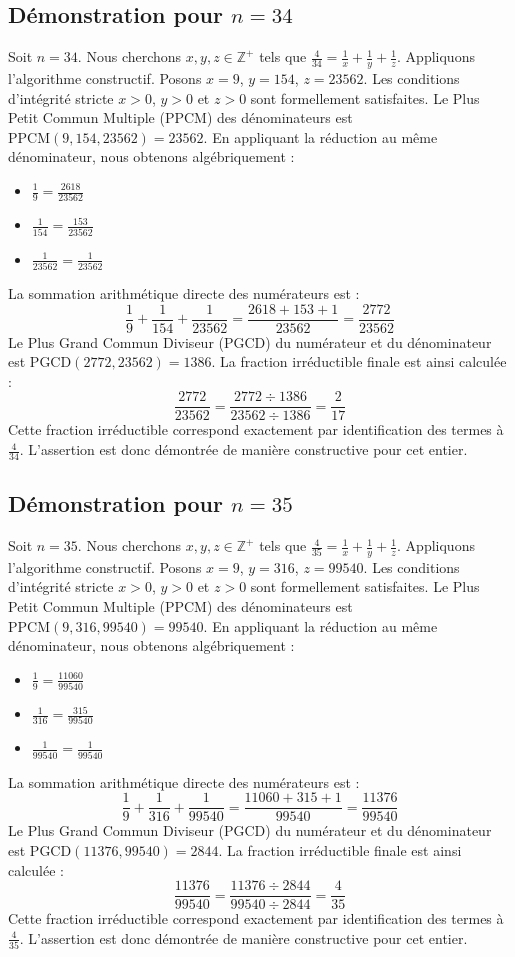 \documentclass[11pt,a4paper]{article}
\begin{document}
\subsection{Démonstration pour $n = 34$}
Soit $n = 34$. Nous cherchons $x, y, z \in \mathbb{Z}^{+}$ tels que $\frac{4}{34} = \frac{1}{x} + \frac{1}{y} + \frac{1}{z}$.
Appliquons l'algorithme constructif. Posons $x = 9$, $y = 154$, $z = 23562$.
Les conditions d'intégrité stricte $x > 0$, $y > 0$ et $z > 0$ sont formellement satisfaites.
Le Plus Petit Commun Multiple (PPCM) des dénominateurs est $\text{PPCM}(9, 154, 23562) = 23562$.
En appliquant la réduction au même dénominateur, nous obtenons algébriquement :
\begin{itemize}
    \item $\frac{1}{9} = \frac{2618}{23562}$
    \item $\frac{1}{154} = \frac{153}{23562}$
    \item $\frac{1}{23562} = \frac{1}{23562}$
\end{itemize}
La sommation arithmétique directe des numérateurs est :
$$ \frac{1}{9} + \frac{1}{154} + \frac{1}{23562} = \frac{2618 + 153 + 1}{23562} = \frac{2772}{23562} $$
Le Plus Grand Commun Diviseur (PGCD) du numérateur et du dénominateur est $\text{PGCD}(2772, 23562) = 1386$.
La fraction irréductible finale est ainsi calculée :
$$ \frac{2772}{23562} = \frac{2772 \div 1386}{23562 \div 1386} = \frac{2}{17} $$
Cette fraction irréductible correspond exactement par identification des termes à $\frac{4}{34}$. L'assertion est donc démontrée de manière constructive pour cet entier.

\subsection{Démonstration pour $n = 35$}
Soit $n = 35$. Nous cherchons $x, y, z \in \mathbb{Z}^{+}$ tels que $\frac{4}{35} = \frac{1}{x} + \frac{1}{y} + \frac{1}{z}$.
Appliquons l'algorithme constructif. Posons $x = 9$, $y = 316$, $z = 99540$.
Les conditions d'intégrité stricte $x > 0$, $y > 0$ et $z > 0$ sont formellement satisfaites.
Le Plus Petit Commun Multiple (PPCM) des dénominateurs est $\text{PPCM}(9, 316, 99540) = 99540$.
En appliquant la réduction au même dénominateur, nous obtenons algébriquement :
\begin{itemize}
    \item $\frac{1}{9} = \frac{11060}{99540}$
    \item $\frac{1}{316} = \frac{315}{99540}$
    \item $\frac{1}{99540} = \frac{1}{99540}$
\end{itemize}
La sommation arithmétique directe des numérateurs est :
$$ \frac{1}{9} + \frac{1}{316} + \frac{1}{99540} = \frac{11060 + 315 + 1}{99540} = \frac{11376}{99540} $$
Le Plus Grand Commun Diviseur (PGCD) du numérateur et du dénominateur est $\text{PGCD}(11376, 99540) = 2844$.
La fraction irréductible finale est ainsi calculée :
$$ \frac{11376}{99540} = \frac{11376 \div 2844}{99540 \div 2844} = \frac{4}{35} $$
Cette fraction irréductible correspond exactement par identification des termes à $\frac{4}{35}$. L'assertion est donc démontrée de manière constructive pour cet entier.
\end{document}
